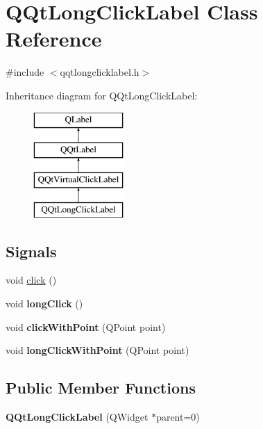 \hypertarget{class_q_qt_long_click_label}{}\section{Q\+Qt\+Long\+Click\+Label Class Reference}
\label{class_q_qt_long_click_label}


{\ttfamily \#include $<$qqtlongclicklabel.\+h$>$}

Inheritance diagram for Q\+Qt\+Long\+Click\+Label\+:\begin{figure}[H]
\begin{center}
\leavevmode
\includegraphics[height=4.000000cm]{class_q_qt_long_click_label}
\end{center}
\end{figure}
\subsection*{Signals}
\begin{DoxyCompactItemize}
\item 
void \mbox{\hyperlink{class_q_qt_long_click_label_a4dd0fb87e6907f9f45162d95c8bd0d60}{click}} ()
\item 
\mbox{\label{class_q_qt_long_click_label_af0f7cc5950c5f6e4a48c7da4064fb13b}} 
void {\bfseries long\+Click} ()
\item 
\mbox{\label{class_q_qt_long_click_label_a01c540d119f85abe6979678123745d9f}} 
void {\bfseries click\+With\+Point} (Q\+Point point)
\item 
\mbox{\label{class_q_qt_long_click_label_a811df04e6d865086de317644c612bd5f}} 
void {\bfseries long\+Click\+With\+Point} (Q\+Point point)
\end{DoxyCompactItemize}
\subsection*{Public Member Functions}
\begin{DoxyCompactItemize}
\item 
\mbox{\label{class_q_qt_long_click_label_a45c75d4a0aee93c30789f37f8e53b2fc}} 
{\bfseries Q\+Qt\+Long\+Click\+Label} (Q\+Widget $\ast$parent=0)
\end{DoxyCompactItemize}
